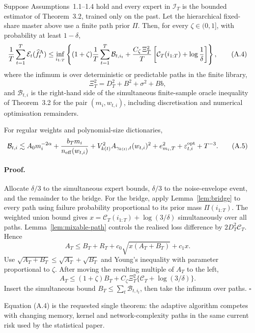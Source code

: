 \begin{theorem}
\label{thm:adaptive-oracle}
Suppose Assumptions~1.1--1.4 hold and every expert in
\(\mathcal I_T\) is the bounded estimator of Theorem~3.2, trained only on the
past.  Let the hierarchical fixed-share master above use a finite path prior
\(\Pi\).  Then, for every \(\zeta\in(0,1]\), with probability at least
\(1-\delta\),
\[
 \frac1T\sum_{t=1}^T
 \mathcal E_t(\widehat f_t^{\rm A})
 \le
 \inf_{i_{1:T}}
 \left\{
 (1+\zeta)\frac1T\sum_{t=1}^T
 \mathcal B_{t,i_t}
 +
 \frac{C_\zeta\,\Xi_T^2}{T}
 \left[
 \mathcal C_T(i_{1:T})+\log\frac1\delta
 \right]
 \right\},
 \tag{A.4}
\]
where the infimum is over deterministic or predictable paths in the finite
library,
\[
 \Xi_T^2=D_T^2+B^2+\sigma^2+Bb,
\]
and \(\mathcal B_{t,i}\) is the right-hand side of the simultaneous
finite-sample oracle inequality of Theorem~3.2 for the pair
\((m_i,w_{t,i})\), including discretisation and numerical optimisation
remainders.

For regular weights and polynomial-size dictionaries,
\[
 \mathcal B_{t,i}
 \lesssim
 A_0m_i^{-2\alpha}
 +\frac{b_Tm_i}{n_{\rm eff}(w_{t,i})}
 +V_{k(t)}^2A_{\gamma_{k(t)},t}(w_{t,i})^2
 +e_{m_i,T}^2+\varepsilon^{\rm opt}_{t,i}+T^{-3}.
 \tag{A.5}
\]
\end{theorem}

\paragraph{Proof.}
Allocate \(\delta/3\) to the simultaneous expert bounds, \(\delta/3\) to the
noise-envelope event, and the remainder to the bridge.  For the bridge, apply
Lemma~\ref{lem:bridge} to every path using failure probability
proportional to its prior mass \(\Pi(i_{1:T})\).  The weighted union bound gives
\(x=\mathcal C_T(i_{1:T})+\log(3/\delta)\) simultaneously over all paths.
Lemma~\ref{lem:mixable-path} controls the realised loss difference by
\(2D_T^2\mathcal C_T\).  Hence
\[
 A_T
 \le
 B_T+R_T+c_0\sqrt{x(A_T+B_T)}+c_1x.
\]
Use
\(\sqrt{A_T+B_T}\le\sqrt{A_T}+\sqrt{B_T}\) and Young's inequality with
parameter proportional to \(\zeta\).  After moving the resulting multiple of
\(A_T\) to the left,
\[
 A_T
 \le
 (1+\zeta)B_T
 +C_\zeta\Xi_T^2
 \{\mathcal C_T+\log(3/\delta)\}.
\]
Insert the simultaneous bound \(B_T\le\sum_t\mathcal B_{t,i_t}\), then take the
infimum over paths. \(\square\)

Equation (A.4) is the requested single theorem: the adaptive algorithm competes
with changing memory, kernel and network-complexity paths in the same current
risk used by the statistical paper.

